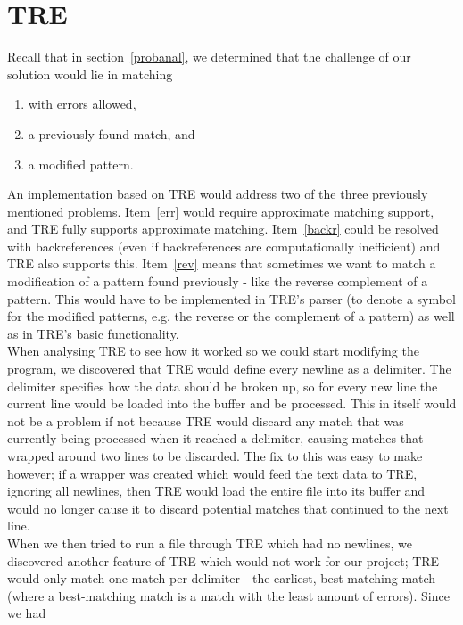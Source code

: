 \section{TRE}\label{tre}
Recall that in section~\ref{probanal}, we determined that the challenge of our 
solution would lie in matching
\begin{enumerate}
\item \label{err} with errors allowed,
\item \label{backr} a previously found match, and 
\item \label{rev} a modified pattern.
\end{enumerate}
An implementation based on TRE would address two of the three previously mentioned 
problems. Item~\ref{err} would require approximate matching support, and 
TRE fully supports approximate matching. Item~\ref{backr} could be resolved 
with backreferences (even if backreferences are computationally inefficient) 
and TRE also supports this. Item~\ref{rev} means that sometimes we want to 
match a modification of a pattern found previously - like the reverse 
complement of a pattern. This would have to be implemented in TRE's parser 
(to denote a symbol for the modified patterns, e.g. the reverse or the 
complement of a pattern) as 
well as in TRE's basic functionality.\\
When analysing TRE to see how it worked so we could start modifying the 
program, we discovered that TRE would define every newline as a delimiter. The 
delimiter specifies how the data should be broken up, so for every new line 
the current line would be loaded into the buffer and be processed. This in 
itself would not be a problem if not because TRE would discard any match that 
was currently being processed when it reached a delimiter, causing matches that 
wrapped around two lines to be discarded. The fix to this was easy to make 
however; if a wrapper was created which would feed the text data to TRE, 
ignoring all newlines, then TRE would load the entire file into its buffer 
and would no longer cause it to discard potential matches that continued to 
the next line.\\
When we then tried to run a file through TRE which had no newlines, we discovered 
another feature of TRE which would not work for our project; TRE would only 
match one match per delimiter - the earliest, best-matching match (where a 
best-matching match is a match with the least amount of errors). Since we had 
